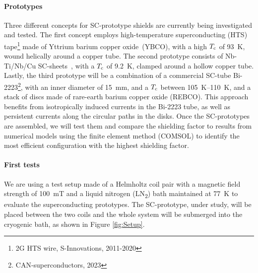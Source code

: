 \begin{refsection}
        \paragraph{Prototypes}
        Three different concepts for SC-prototype shields are currently being investigated and tested. 
        The first concept employs high-temperature superconducting (HTS) tape\footnote{2G HTS wire, S-Innovations, 2011-2020} made of Yttrium barium copper oxide~(YBCO), with a high $T_{\rm c}$ of \SI{93}{K}, wound helically around a copper tube. The second prototype consists of Nb-Ti/Nb/Cu SC-sheets~\cite{Barna2018}, with a $T_{\rm c}$ of \SI{9.2}{K}, clamped around a hollow copper tube. 
        Lastly, the third prototype will be a combination of a commercial SC-tube Bi-2223\footnote{CAN-superconductors, 2023}, with an inner diameter of \SI{15}{mm}, and a $T_{\rm c}$ between \SIrange{105}{110}{K}, and a stack of discs made of rare-earth barium copper oxide (REBCO)\@. 
        This approach benefits from isotropically induced currents in the Bi-2223 tube, as well as persistent currents along the circular paths in the disks.
        Once the SC-prototypes are assembled, we will test them and compare the shielding factor to results from numerical models using the finite element method (COMSOL) to identify the most efficient configuration with the highest shielding factor. 

        \paragraph{First tests}
We are using a test setup made of a Helmholtz coil pair with a magnetic field strength of \SI{100}{mT} and a liquid nitrogen (LN\textsubscript{2}) bath maintained at \SI{77}{K} to evaluate the superconducting prototypes. The SC-prototype, under study, will be placed between the two coils and the whole system will be submerged into the cryogenic bath, as shown in Figure \ref{fig:Setup}.


\end{refsection}

